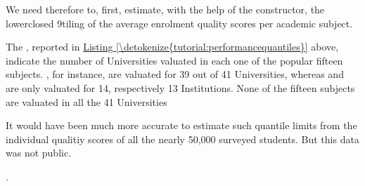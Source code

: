 \documentclass[a4paper,12pt,english]{sphinxhowto}
\begin{document}
We need therefore to, first, estimate, with the help of the  constructor, the lowerclosed  9\sphinxhyphen{}tiling of the average enrolment quality scores per academic subject.
\def\sphinxLiteralBlockLabel{\label{\detokenize{tutorial:performancequantiles}}}
\begin{sphinxVerbatim}[commandchars=\\\{\},numbers=left,firstnumber=1,stepnumber=1]
   
  
\end{sphinxVerbatim}

The , reported in \hyperref[\detokenize{tutorial:performancequantiles}]{Listing \ref{\detokenize{tutorial:performancequantiles}}} above, indicate the number of Universities valuated in each one of the popular fifteen subjects. , for instance, are valuated for 39 out of 41 Universities, whereas  and  are only valuated for 14, respectively 13 Institutions. None of the fifteen subjects are valuated in all the 41 Universities %
\begin{footnote}[30]\sphinxAtStartFootnote
It would have been much more accurate to estimate such quantile limits from the individual qualitiy scores of all the nearly 50,000 surveyed students. But this data was not public.
%
\end{footnote}.
\end{document}
